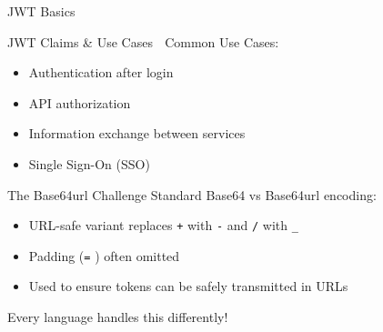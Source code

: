\documentclass[presentation,aspectratio=169]{beamer}
\begin{document}
\begin{frame}[label={sec:org9be340e},fragile]{JWT Basics}
\begin{block}{JWT Claims \& Use Cases 🔰}
\alert{Common Use Cases:}
\begin{itemize}
\item Authentication after login
\item API authorization
\item Information exchange between services
\item Single Sign-On (SSO)
\end{itemize}
\end{block}
\begin{block}{The Base64url Challenge}
Standard Base64 vs Base64url encoding:
\begin{itemize}
\item URL-safe variant replaces \texttt{+} with \texttt{-} and \texttt{/} with \texttt{\_}
\item Padding (\texttt{=} ) often omitted
\item Used to ensure tokens can be safely transmitted in URLs
\end{itemize}

\alert{Every language handles this differently!}
\end{block}
\end{frame}
\end{document}
